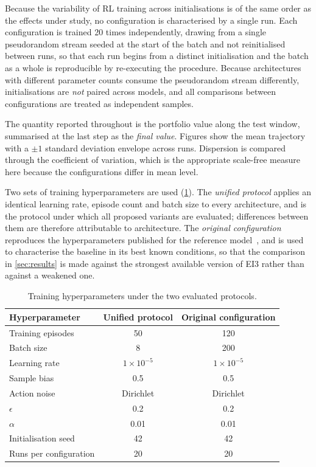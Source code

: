 \documentclass[aps,floatfix,superscriptaddress,twocolumn,tightenlines,amsmath,amssymb,nofootinbib,10pt,longbibliography,prl]{revtex4-2}
\begin{document}
Because the variability of RL training across initialisations is of the same order as the effects under study, no configuration is characterised by a single run. Each configuration is trained \num{20} times independently, drawing from a single pseudorandom stream seeded at the start of the batch and not reinitialised between runs, so that each run begins from a distinct initialisation and the batch as a whole is reproducible by re-executing the procedure. Because architectures with different parameter counts consume the pseudorandom stream differently, initialisations are \emph{not} paired across models, and all comparisons between configurations are treated as independent samples.

The quantity reported throughout is the portfolio value along the test window, summarised at the last step as the \emph{final value}. Figures show the mean trajectory with a $\pm 1$ standard deviation envelope across runs. Dispersion is compared through the coefficient of variation, which is the appropriate scale-free measure here because the configurations differ in mean level.

Two sets of training hyperparameters are used (\ref{tab:hyperparams}). The \emph{unified protocol} applies an identical learning rate, episode count and batch size to every architecture, and is the protocol under which all proposed variants are evaluated; differences between them are therefore attributable to architecture. The \emph{original configuration} reproduces the hyperparameters published for the reference model~\cite{RLportfolio}, and is used to characterise the baseline in its best known conditions, so that the comparison in \ref{sec:results} is made against the strongest available version of EI3 rather than against a weakened one.

\begin{table}[htbp]
  \centering
  \caption{Training hyperparameters under the two evaluated protocols.}
  \label{tab:hyperparams}
  \begin{tabular}{lcc}
    \toprule
    Hyperparameter & Unified protocol & Original configuration \\
    \midrule
    Training episodes      & 50                & 120 \\
    Batch size             & 8                 & 200 \\
    Learning rate          & $1\times10^{-5}$  & $1\times10^{-5}$ \\
    Sample bias            & 0.5               & 0.5 \\
    Action noise           & Dirichlet         & Dirichlet \\
    \quad $\epsilon$       & 0.2               & 0.2 \\
    \quad $\alpha$         & 0.01              & 0.01 \\
    Initialisation seed    & 42                & 42 \\
    Runs per configuration & 20                & 20 \\
    \bottomrule
  \end{tabular}
  \\[3pt]
\end{table}
\end{document}
